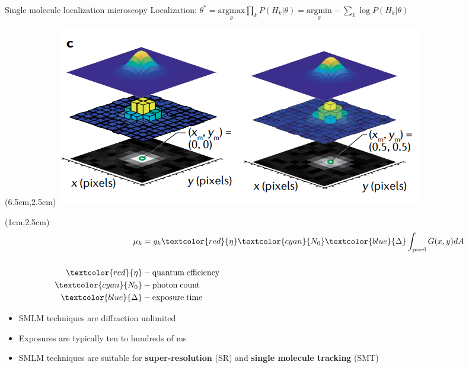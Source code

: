 \documentclass{beamer}					%
\begin{document}
\begin{frame}{Single molecule localization microscopy}
Localization: $\theta^{*} = \underset{\theta}{\mathrm{argmax}}\prod_{k}P(H_{k}|\theta)= \underset{\theta}{\mathrm{argmin}}-\sum_{k}\log P(H_{k}|\theta)$

\begin{textblock*}{8cm}(6.5cm,2.5cm)
\includegraphics[width=\textwidth]{Model.png}
\end{textblock*}

\begin{textblock*}{2cm}(1cm,2.5cm)
\begin{align*}
\mu_{k} &= g_{k}\textcolor{red}{\eta} \textcolor{cyan}{N_{0}}\textcolor{blue}{\Delta}\int_{\mathrm{pixel}} G(x,y)dA\\
\\
\textcolor{red}{\eta} &- \mathrm{quantum\; efficiency}\\
\textcolor{cyan}{N_{0}} &- \mathrm{photon\; count}\\
\textcolor{blue}{\Delta} &- \mathrm{exposure\; time}
\end{align*}
\end{textblock*}

\vspace{2in}

\begin{itemize}
\item SMLM techniques are diffraction unlimited
\item Exposures are typically ten to hundreds of ms
\item SMLM techniques are suitable for \textbf{super-resolution} (SR) and \textbf{single molecule tracking} (SMT)
\end{itemize}

\end{frame}
\end{document}
